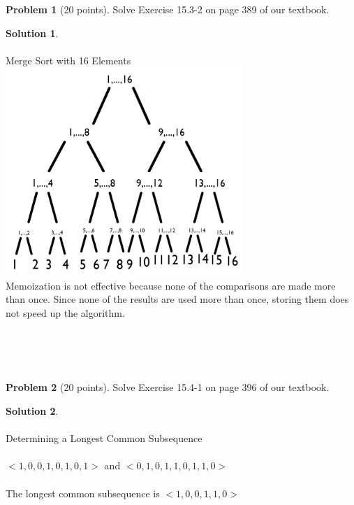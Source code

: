 \documentclass{article}
\theoremstyle{definition}
\newtheorem{problem}{Problem}
\newtheorem*{solution}{Solution}
\begin{document}
\begin{problem}[20 points]
Solve Exercise 15.3-2 on page 389 of our textbook. 
\end{problem}
\begin{solution} \\
\\
Merge Sort with 16 Elements
\\
\includegraphics[width = 9cm]{recursiontree.png}
\\
Memoization is not effective because none of the comparisons are made more than once. Since none of the results are used more than once, storing them does not speed up the algorithm.
\\
\\
\end{solution}
\\
\\
\begin{problem}[20 points]
Solve Exercise 15.4-1 on page 396 of our textbook. 
\end{problem}
\begin{solution} \\
\\
Determining a Longest Common Subsequence\\
\\
$<1,0,0,1,0,1,0,1>$ and $<0,1,0,1,1,0,1,1,0>$\\
\\
The longest common subsequence is $<1,0,0,1,1,0>$\\
\\

\end{solution}

\newpage
\end{document}
